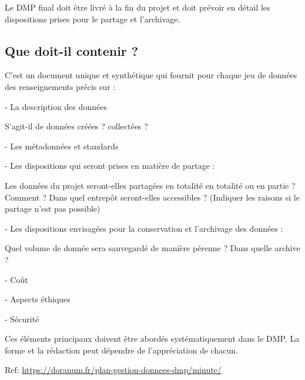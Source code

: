 \documentclass[11pt,oneside]{article}
\begin{document}
\begin{flushleft}
Le DMP final doit être livré à la fin du projet et doit prévoir en détail les dispositions prises pour le partage et l’archivage.
\end{flushleft}

\subsection*{Que doit-il contenir ?}

\begin{flushleft}
C’est un document unique et synthétique qui fournit pour chaque jeu de données des renseignements précis sur :
\end{flushleft}

-	La description des données

\begin{flushleft}
S’agit-il de données créées ? collectées ?
\end{flushleft}

-	Les métadonnées et standards

-	Les dispositions qui seront prises en matière de partage :

\begin{flushleft}
Les données du projet seront-elles partagées en totalité en totalité ou en partie ? Comment ? Dans quel entrepôt seront-elles accessibles ? (Indiquer les raisons si le partage n’est pas possible)
\end{flushleft}

\newpage

-	Les dispositions envisagées pour la conservation et l’archivage des données :

\begin{flushleft}
Quel volume de donnée sera sauvegardé de manière pérenne ? Dans quelle archive ?
\end{flushleft}

-	Coût

-	Aspects éthiques

-	Sécurité

\begin{flushleft}
Ces éléments principaux doivent être abordés systématiquement dans le DMP. La forme et la rédaction peut dépendre de l’appréciation de chacun.
\end{flushleft}


\begin{flushleft}
Ref: \url{https://doranum.fr/plan-gestion-donnees-dmp/minute/}\hypersetup {colorlinks=true,linkcolor=blue,urlcolor=blue}
\end{flushleft}
\end{document}
